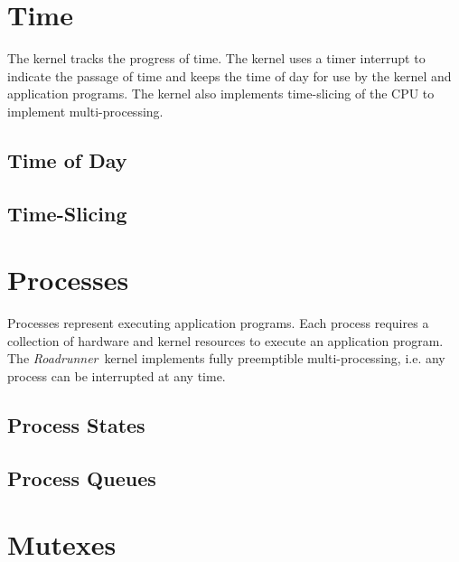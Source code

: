 \pagestyle{empty}


\def\roadrunner{{\em Roadrunner}}
\def\rrfs{{\tt rrfs}}







\chapter{Time}

The kernel tracks the progress of time.  The kernel uses a timer
interrupt to indicate the passage of time and keeps the time of
day for use by the kernel and application programs.  The kernel
also implements time-slicing of the CPU to implement
multi-processing.


\section{Time of Day}


\section{Time-Slicing}


\chapter{Processes}

Processes represent executing application programs.  Each process
requires a collection of hardware and kernel resources to execute
an application program.  The \roadrunner\  kernel implements
fully preemptible multi-processing, i.e. any process can be
interrupted at any time.


\section{Process States}


\section{Process Queues}


\chapter{Mutexes}

